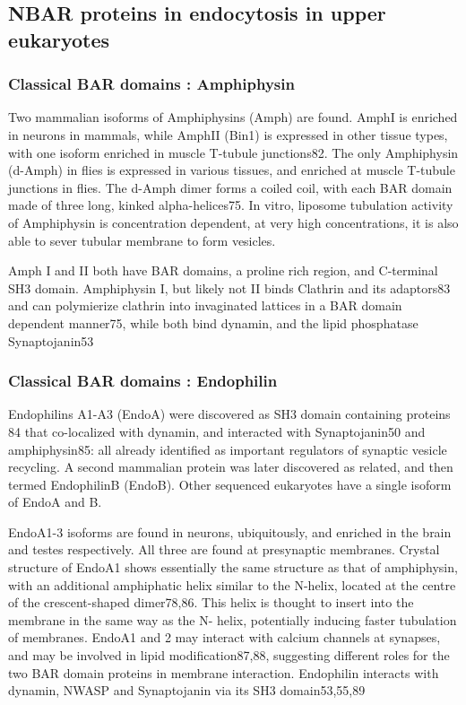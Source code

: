 	\subsection{NBAR proteins in endocytosis in upper eukaryotes}		
		\subsubsection{Classical BAR domains : Amphiphysin}
		Two mammalian isoforms of Amphiphysins (Amph) are found. AmphI is enriched in neurons in mammals, while AmphII (Bin1) is expressed in other tissue types, with one isoform enriched in muscle T-tubule junctions82. The only Amphiphysin (d-Amph) in flies is expressed in various tissues, and enriched at muscle T-tubule junctions in flies. The d-Amph dimer forms a coiled coil, with each BAR domain made of three long, kinked alpha-helices75. In vitro, liposome tubulation activity of Amphiphysin is concentration dependent, at very high concentrations, it is also able to sever tubular membrane to form vesicles. 

		\vspace{5mm}
		Amph I and II both have BAR domains, a proline rich region, and C-terminal SH3 domain. Amphiphysin I, but likely not II binds Clathrin and its adaptors83 and can polymierize clathrin into invaginated lattices in a BAR domain dependent manner75, while both bind dynamin, and the lipid phosphatase Synaptojanin53


		\subsubsection{Classical BAR domains : Endophilin}
		Endophilins A1-A3 (EndoA) were discovered as SH3 domain containing proteins 84 that co-localized with dynamin, and interacted with Synaptojanin50 and amphiphysin85: all already identified as important regulators of synaptic vesicle recycling. A second mammalian protein was later discovered as related, and then termed EndophilinB (EndoB). Other sequenced eukaryotes have a single isoform of EndoA and B.

		\vspace{5mm}
		EndoA1-3 isoforms are found in neurons, ubiquitously, and enriched in the brain and testes respectively. All three are found at presynaptic membranes. Crystal structure of EndoA1 shows essentially the same structure as that of amphiphysin, with an additional amphiphatic helix similar to the N-helix, located at the centre of the crescent-shaped dimer78,86. This helix is thought to insert into the membrane in the same way as the N- helix, potentially inducing faster tubulation of membranes. EndoA1 and 2 may interact with calcium channels at synapses, and may be involved in lipid modification87,88, suggesting different roles for the two BAR domain proteins in membrane interaction. Endophilin interacts with dynamin, NWASP and Synaptojanin via its SH3 domain53,55,89


